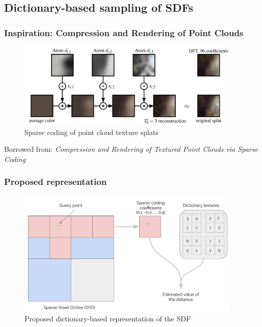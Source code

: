 \documentclass[handout]{beamer}
\begin{document}
\subsection{Dictionary-based sampling of SDFs}
\begin{frame}
  \frametitle{Inspiration: Compression and Rendering of Point Clouds}
  \begin{figure}
    \centering
    \includegraphics[width=0.95\textwidth]{figures/point-cloud-splat.png}
    \caption{Sparse coding of point cloud texture splats}
    \label{fig:spoint-cloud-splat}
  \end{figure}
  \scriptsize Borrowed from: \textit{Compression and Rendering of Textured Point Clouds via Sparse Coding}
\end{frame}
\begin{frame}
  \frametitle{Proposed representation}
  \begin{figure}
    \centering
    \includegraphics[width=0.95\textwidth]{figures/sparse-coding-sdf.png}
    \caption{Proposed dictionary-based representation of the SDF}
    \label{fig:sparse-coding-sdf}
  \end{figure}
\end{frame}
\end{document}
